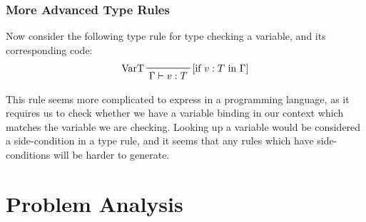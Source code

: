 \documentclass{UoYCSproject}
\begin{document}
\subsection{More Advanced Type Rules}
\label{sec:AdvancedRules}
Now consider the following type rule for type checking a variable, and its
corresponding code:
\begin{displaymath}
    \prftree[l,r]{[if $v:T$ in $\Gamma$]}{VarT}{\Gamma \vdash v:T}
\end{displaymath}


This rule seems more complicated to express in a programming language, as it
requires us to check whether we have a variable binding in our context which
matches the variable we are checking. Looking up a variable would be considered
a side-condition in a type rule, and it seems that any rules which have
side-conditions will be harder to generate.

\chapter{Problem Analysis}
\end{document}

